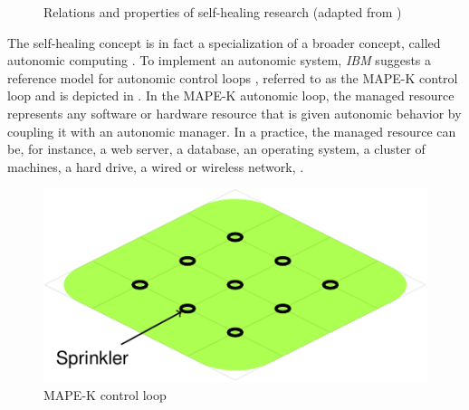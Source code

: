 \begin{figure}[!ht]
{
  }
  \caption{Relations and properties of self-healing research (adapted
    from \citep{Psaier11})}
  \label{fig:introduction:self-healing}
\end{figure}


The self-healing concept is in fact a specialization of a broader
concept, called autonomic computing \citep{Kephart03}.
%
To implement an autonomic system, \emph{IBM} suggests a reference
model for autonomic control loops \citep{IBM06}, referred to as the
\ac{MAPE-K} control loop and is depicted in
.
%
In the \ac{MAPE-K} autonomic loop, the managed resource represents
any software or hardware resource that is given autonomic behavior by
coupling it with an autonomic manager.
%
In a practice, the managed resource can be, for instance, a web
server, a database, an operating system, a cluster of machines, a hard
drive, a wired or wireless network, \etc.

\begin{figure}[!ht]
  \includegraphics[width=0.6\columnwidth,page=13]{figures/introduction/figures/main.pdf}
  \caption{\acs{MAPE-K} control loop\label{fig:intro:MAPE-K-control-loop} }
\end{figure}




